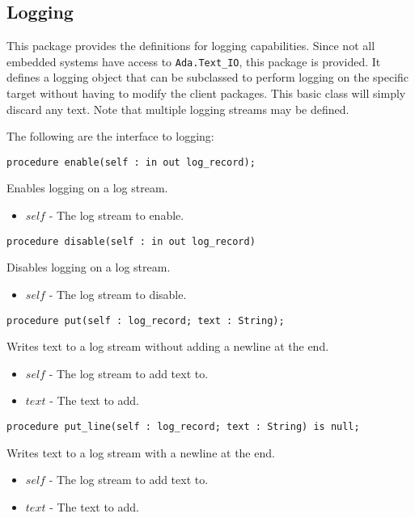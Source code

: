 \documentclass[10pt, openany]{book}
\newcommand{\package}[1]{\texttt{#1}}
\begin{document}
\subsection{Logging}
This package provides the definitions for logging capabilities.  Since not all embedded systems have access to \package{Ada.Text\_IO}, this package is provided.  It defines a logging object that can be subclassed to perform logging on the specific target without having to modify the client packages.  This basic class will simply discard any text.  Note that multiple logging streams may be defined.

The following are the interface to logging:
\begin{lstlisting}
procedure enable(self : in out log_record);
\end{lstlisting}
Enables logging on a log stream.
\begin{itemize}
  \item $self$ - The log stream to enable.
\end{itemize}

\begin{lstlisting}
procedure disable(self : in out log_record)
\end{lstlisting}
Disables logging on a log stream.
\begin{itemize}
  \item $self$ - The log stream to disable.
\end{itemize}

\begin{lstlisting}
procedure put(self : log_record; text : String);
\end{lstlisting}
Writes text to a log stream without adding a newline at the end.
\begin{itemize}
  \item $self$ - The log stream to add text to.
  \item $text$ - The text to add.
\end{itemize}

\begin{lstlisting}
procedure put_line(self : log_record; text : String) is null;
\end{lstlisting}
Writes text to a log stream with a newline at the end.
\begin{itemize}
  \item $self$ - The log stream to add text to.
  \item $text$ - The text to add.
\end{itemize}
\end{document}
